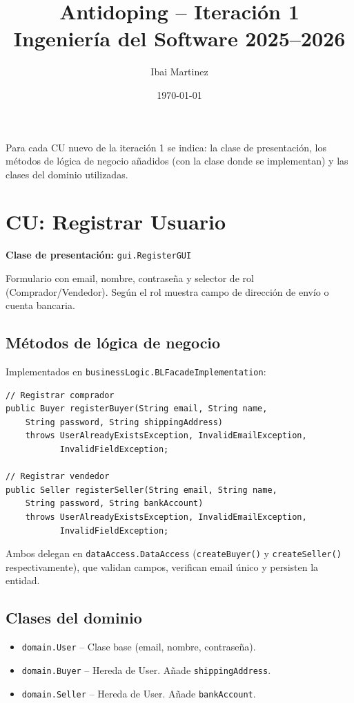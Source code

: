 \documentclass[12pt,a4paper]{article}
\title{\textbf{Antidoping -- Iteración 1} \\ \large Ingeniería del Software 2025--2026}
\author{Ibai Martinez}
\date{\today}
\begin{document}
\maketitle

Para cada CU nuevo de la iteración 1 se indica: la clase de presentación, los métodos de lógica de negocio añadidos (con la clase donde se implementan) y las clases del dominio utilizadas.

\section{CU: Registrar Usuario}

\textbf{Clase de presentación:} \texttt{gui.RegisterGUI}

Formulario con email, nombre, contraseña y selector de rol (Comprador/Vendedor). Según el rol muestra campo de dirección de envío o cuenta bancaria.

\subsection{Métodos de lógica de negocio}

Implementados en \texttt{businessLogic.BLFacadeImplementation}:

\begin{lstlisting}
// Registrar comprador
public Buyer registerBuyer(String email, String name,
    String password, String shippingAddress)
    throws UserAlreadyExistsException, InvalidEmailException,
           InvalidFieldException;

// Registrar vendedor
public Seller registerSeller(String email, String name,
    String password, String bankAccount)
    throws UserAlreadyExistsException, InvalidEmailException,
           InvalidFieldException;
\end{lstlisting}

Ambos delegan en \texttt{dataAccess.DataAccess} (\texttt{createBuyer()} y \texttt{createSeller()} respectivamente), que validan campos, verifican email único y persisten la entidad.

\subsection{Clases del dominio}

\begin{itemize}
    \item \texttt{domain.User} -- Clase base (email, nombre, contraseña).
    \item \texttt{domain.Buyer} -- Hereda de User. Añade \texttt{shippingAddress}.
    \item \texttt{domain.Seller} -- Hereda de User. Añade \texttt{bankAccount}.
\end{itemize}
\end{document}
